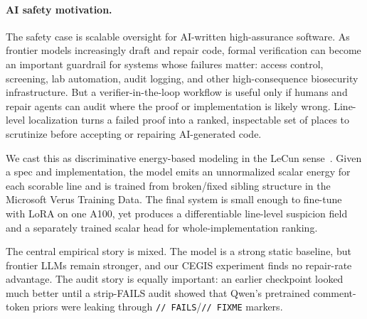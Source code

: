 \documentclass[10pt]{article}
\begin{document}
\paragraph{AI safety motivation.}
The safety case is scalable oversight for AI-written high-assurance
software. As frontier models increasingly draft and repair code, formal
verification can become an important guardrail for systems whose failures
matter: access control, screening, lab automation, audit logging, and
other high-consequence biosecurity infrastructure. But a
verifier-in-the-loop workflow is useful only if humans and repair agents
can audit where the proof or implementation is likely wrong. Line-level
localization turns a failed proof into a ranked, inspectable set of
places to scrutinize before accepting or repairing AI-generated code.

We cast this as discriminative energy-based modeling in the LeCun
sense~\cite{lecun2006tutorial}. Given a spec and implementation, the
model emits an unnormalized scalar energy for each scorable line and
is trained from broken/fixed sibling structure in the Microsoft Verus
Training Data. The final system is small enough to fine-tune with
LoRA on one A100, yet produces a differentiable line-level suspicion
field and a separately trained scalar head for whole-implementation
ranking.

The central empirical story is mixed. The model is a strong static
baseline, but frontier LLMs remain stronger, and our CEGIS experiment
finds no repair-rate advantage. The audit story is equally important:
an earlier checkpoint looked much better until a strip-FAILS audit
showed that Qwen's pretrained comment-token priors were leaking
through \texttt{// FAILS}/\texttt{// FIXME} markers.
\end{document}
